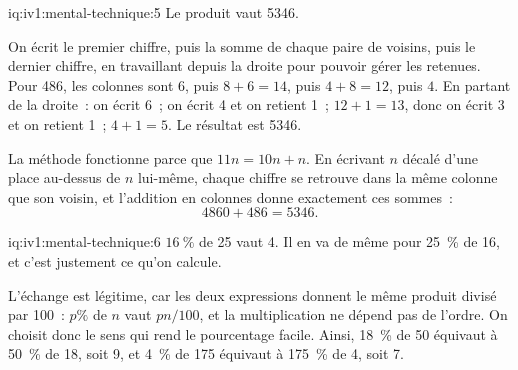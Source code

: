 \begin{solution}{iq:iv1:mental-technique:5}
Le produit vaut 5346.

On écrit le premier chiffre, puis la somme de chaque paire de voisins, puis le dernier chiffre, en travaillant depuis la droite pour pouvoir gérer les retenues. Pour 486, les colonnes sont $6$, puis $8 + 6 = 14$, puis $4 + 8 = 12$, puis $4$. En partant de la droite~: on écrit 6~; on écrit 4 et on retient 1~; $12 + 1 = 13$, donc on écrit 3 et on retient 1~; $4 + 1 = 5$. Le résultat est 5346.

La méthode fonctionne parce que $11n = 10n + n$. En écrivant $n$ décalé d'une place au-dessus de $n$ lui-même, chaque chiffre se retrouve dans la même colonne que son voisin, et l'addition en colonnes donne exactement ces sommes~:
\[
4860 + 486 = 5346.
\]

\end{solution}

\begin{solution}{iq:iv1:mental-technique:6}
$16~\%$ de 25 vaut 4. Il en va de même pour 25~\% de 16, et c'est justement ce qu'on calcule.

L'échange est légitime, car les deux expressions donnent le même produit divisé par 100~: $p\%$ de $n$ vaut $pn/100$, et la multiplication ne dépend pas de l'ordre. On choisit donc le sens qui rend le pourcentage facile. Ainsi, 18~\% de 50 équivaut à 50~\% de 18, soit 9, et 4~\% de 175 équivaut à 175~\% de 4, soit 7.

\end{solution}

